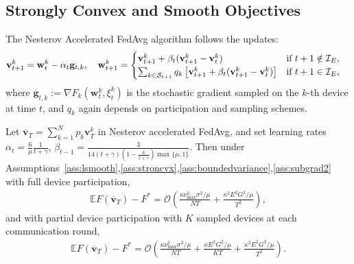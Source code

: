 \subsection{Strongly Convex and Smooth Objectives}
\begin{comment}
We first show that the Nesterov accelerated FedAvg has $\mathcal{O}(1/NT)$
convergence rate for $\mu$-strongly convex and $L$-smooth objectives.
\end{comment}
The Nesterov Accelerated FedAvg algorithm follows the updates:
\begin{align*}
\mathbf{v}_{t+1}^{k} & =\mathbf{w}_{t}^{k}-\alpha_{t}\mathbf{g}_{t,k}, \hspace{1em}
\mathbf{w}_{t+1}^{k} =\begin{cases}
\mathbf{v}_{t+1}^{k}+\beta_{t}(\mathbf{v}_{t+1}^{k}-\mathbf{v}_{t}^{k}) & \text{if }t+1\notin\mathcal{I}_{E},\\
\sum_{k \in {\mathcal{S}}_{t+1}}q_k\left[\mathbf{v}_{t+1}^{k}+\beta_{t}(\mathbf{v}_{t+1}^{k}-\mathbf{v}_{t}^{k})\right] & \text{if }t+1\in\mathcal{I}_{E},
\end{cases}
\end{align*}
where $\mathbf{g}_{t,k}:=\nabla F_{k}(\mathbf{w}_{t}^{k},\xi_{t}^{k})$ is
the stochastic gradient sampled on the $k$-th device at time $t$, and $q_k$ again depends on participation and sampling schemes.  
\begin{theorem}
	\label{thm:nesterov_scvx}Let $\overline{\mathbf{v}}_{T}=\sum_{k=1}^{N}p_{k}\mathbf{v}_{T}^{k}$ in Nesterov accelerated FedAvg,
	and set learning rates $\alpha_{t}=\frac{6}{\mu}\frac{1}{t+\gamma}$,  $\beta_{t-1}=\frac{3}{14(t+\gamma)(1-\frac{6}{t+\gamma})\max\{\mu,1\}}$. Then under Assumptions~\ref{ass:lsmooth},\ref{ass:stroncvx},\ref{ass:boundedvariance},\ref{ass:subgrad2} with full device participation, 
	\small{\begin{align*}
	\mathbb{E}F(\overline{\mathbf{v}}_{T})-F^{\ast}=\mathcal{O}\left(\frac{\kappa\nu_{\max}^{2}\sigma^{2}/\mu}{NT}+\frac{\kappa^{2}E^{2}G^{2}/\mu}{T^{2}}\right),
	\end{align*}}
	and with partial device participation with $K$ sampled devices at
	each communication round, 
	\small{
	\begin{align*}
	\mathbb{E}F(\overline{\mathbf{v}}_{T})-F^{\ast}=\mathcal{O}\left(\frac{\kappa\nu_{\max}^{2}\sigma^{2}/\mu}{NT}+\frac{\kappa E^{2}G^{2}/\mu}{KT}+\frac{\kappa^{2}E^{2}G^{2}/\mu}{T^{2}}\right).
	\end{align*}}
\end{theorem}
